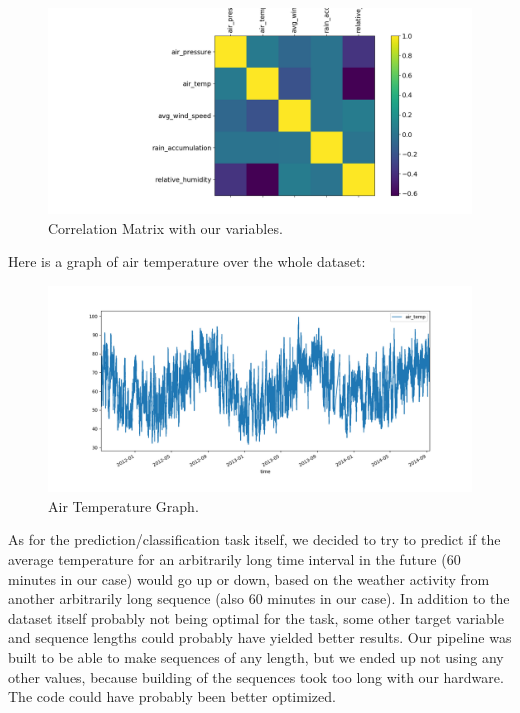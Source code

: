 \documentclass{article}
\begin{document}
  \begin{figure}[h!]
    \begin{center}
      \includegraphics[width=\linewidth]{img/image2.png}
      \caption{Correlation Matrix with our variables.}
      \label{fig:snn}
    \end{center}
  \end{figure}
  Here is a graph of air temperature over the whole dataset:
  \begin{figure}[h!]
    \begin{center}
      \includegraphics[width=\linewidth]{img/image6.png}
      \caption{Air Temperature Graph.}
      \label{fig:snn}
    \end{center}
  \end{figure}
  As for the prediction/classification task itself, we decided to try to predict if the average temperature for an arbitrarily long time interval in the future (60 minutes in our case) would go up or down, based on the weather activity from another arbitrarily long sequence (also 60 minutes in our case). In addition to the dataset itself probably not being optimal for the task, some other target variable and sequence lengths could probably have yielded better results. Our pipeline was built to be able to make sequences of any length, but we ended up not using any other values, because building of the sequences took too long with our hardware. The code could have probably been better optimized.
\end{document}
